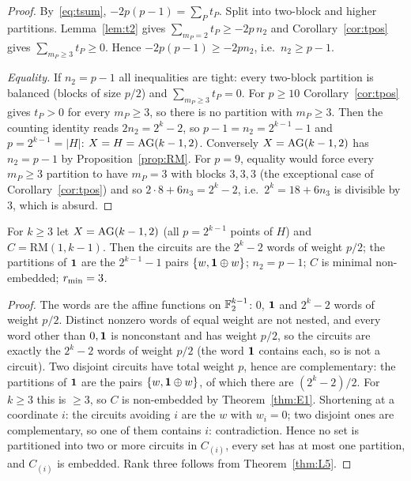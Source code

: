 \begin{proof}
By~\eqref{eq:tsum}, $-2p(p-1)=\sum_Pt_P$. Split into two-block and higher partitions. Lemma~\ref{lem:t2} gives $\sum_{m_P=2}t_P\ge-2p\,n_2$ and Corollary~\ref{cor:tpos} gives $\sum_{m_P\ge3}t_P\ge0$. Hence $-2p(p-1)\ge-2pn_2$, i.e.\ $n_2\ge p-1$.

\emph{Equality.} If $n_2=p-1$ all inequalities are tight: every two-block partition is balanced (blocks of size $p/2$) and $\sum_{m_P\ge3}t_P=0$. For $p\ge10$ Corollary~\ref{cor:tpos} gives $t_P>0$ for every $m_P\ge3$, so there is no partition with $m_P\ge3$. Then the counting identity reads $2n_2=2^k-2$, so $p-1=n_2=2^{k-1}-1$ and $p=2^{k-1}=|H|$: $X=H=\mathrm{AG}(k-1,2)$. Conversely $X=\mathrm{AG}(k-1,2)$ has $n_2=p-1$ by Proposition~\ref{prop:RM}. For $p=9$, equality would force every $m_P\ge3$ partition to have $m_P=3$ with blocks $3,3,3$ (the exceptional case of Corollary~\ref{cor:tpos}) and so $2\cdot8+6n_3=2^k-2$, i.e.\ $2^k=18+6n_3$ is divisible by $3$, which is absurd.
\end{proof}


\begin{proposition}\label{prop:RM}
For $k\ge3$ let $X=\mathrm{AG}(k-1,2)$ (all $p=2^{k-1}$ points of $H$) and $C=\mathrm{RM}(1,k-1)$. Then the circuits are the $2^k-2$ words of weight $p/2$; the partitions of $\mathbf 1$ are the $2^{k-1}-1$ pairs $\{w,\mathbf 1\oplus w\}$; $n_2=p-1$; $C$ is minimal non-embedded; $r_{\min}=3$.
\end{proposition}

\begin{proof}
The words are the affine functions on $\mathbb F_2^{k-1}$: $0$, $\mathbf 1$ and $2^k-2$ words of weight $p/2$. Distinct nonzero words of equal weight are not nested, and every word other than $0,\mathbf 1$ is nonconstant and has weight $p/2$, so the circuits are exactly the $2^k-2$ words of weight $p/2$ (the word $\mathbf 1$ contains each, so is not a circuit). Two disjoint circuits have total weight $p$, hence are complementary: the partitions of $\mathbf 1$ are the pairs $\{w,\mathbf 1\oplus w\}$, of which there are $(2^k-2)/2$. For $k\ge3$ this is $\ge3$, so $C$ is non-embedded by Theorem~\ref{thm:E1}. Shortening at a coordinate $i$: the circuits avoiding $i$ are the $w$ with $w_i=0$; two disjoint ones are complementary, so one of them contains $i$: contradiction. Hence no set is partitioned into two or more circuits in $C_{(i)}$, every set has at most one partition, and $C_{(i)}$ is embedded. Rank three follows from Theorem~\ref{thm:L5}.
\end{proof}

